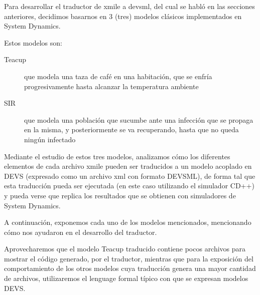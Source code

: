 Para desarrollar el traductor de xmile a devsml, del cual se habló en las secciones anteriores, decidimos basarnos en 3 (tres) modelos clásicos implementados en System Dynamics. 

Estos modelos son: 
\begin{description}
	\item[Teacup] que modela una taza de café en una habitación, que se enfría progresivamente hasta alcanzar la temperatura ambiente
	\item[SIR] 	que modela una población que sucumbe ante una infección que se propaga en la misma, y posteriormente se va recuperando, hasta que no queda ningún infectado
\end{description}

Mediante el estudio de estos tres modelos, analizamos cómo los diferentes elementos de cada archivo xmile pueden ser traducidos a un modelo acoplado en DEVS (expresado como un archivo xml con formato DEVSML), de forma tal que esta traducción pueda ser ejecutada (en este caso utilizando el simulador CD++) y pueda verse que replica los resultados que se obtienen con simuladores de System Dynamics.

A continuación, exponemos cada uno de los modelos mencionados, mencionando cómo nos ayudaron en el desarrollo del traductor. 

Aprovecharemos que el modelo Teacup traducido contiene pocos archivos para mostrar el código generado, por el traductor, mientras que para la exposición del comportamiento de los otros modelos cuya traducción genera una mayor cantidad de archivos, utilizaremos el lenguage formal típico con que se expresan modelos DEVS.
